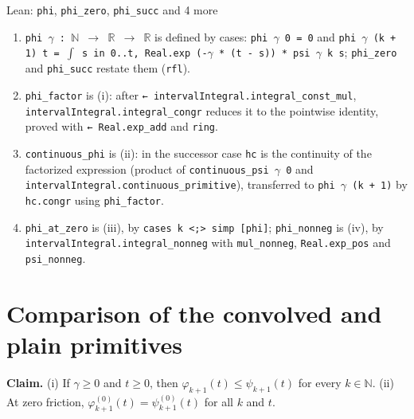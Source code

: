\documentclass[11pt,a4paper]{article}
\begin{document}
\begin{leanbox}{Lean: \texttt{phi}, \texttt{phi\_\allowbreak{}zero}, \texttt{phi\_\allowbreak{}succ} and 4 more}
\begin{enumerate}
\item \texttt{phi \ensuremath{\gamma} : \ensuremath{\mathbb N} \ensuremath{\to} \ensuremath{\mathbb R} \ensuremath{\to} \ensuremath{\mathbb R}} is defined by cases: \texttt{phi \ensuremath{\gamma} 0 = 0} and \texttt{phi \ensuremath{\gamma} (k + 1) t = \ensuremath{\int} s in 0.\allowbreak{}.\allowbreak{}t, Real.\allowbreak{}exp (-\allowbreak{}\ensuremath{\gamma} * (t -\allowbreak{} s)) * psi \ensuremath{\gamma} k s}; \texttt{phi\_\allowbreak{}zero} and \texttt{phi\_\allowbreak{}succ} restate them (\texttt{rfl}).

\item \texttt{phi\_\allowbreak{}factor} is (i): after \texttt{← interval\allowbreak{}Integral.\allowbreak{}integral\_\allowbreak{}const\_\allowbreak{}mul}, \texttt{interval\allowbreak{}Integral.\allowbreak{}integral\_\allowbreak{}congr} reduces it to the pointwise identity, proved with \texttt{← Real.\allowbreak{}exp\_\allowbreak{}add} and \texttt{ring}.

\item \texttt{continuous\_\allowbreak{}phi} is (ii): in the successor case \texttt{hc} is the continuity of the factorized expression (product of \texttt{continuous\_\allowbreak{}psi \ensuremath{\gamma} 0} and \texttt{interval\allowbreak{}Integral.\allowbreak{}continuous\_\allowbreak{}primitive}), transferred to \texttt{phi \ensuremath{\gamma} (k + 1)} by \texttt{hc.\allowbreak{}congr} using \texttt{phi\_\allowbreak{}factor}.

\item \texttt{phi\_\allowbreak{}at\_\allowbreak{}zero} is (iii), by \texttt{cases k <;> simp [phi]}; \texttt{phi\_\allowbreak{}nonneg} is (iv), by \texttt{interval\allowbreak{}Integral.\allowbreak{}integral\_\allowbreak{}nonneg} with \texttt{mul\_\allowbreak{}nonneg}, \texttt{Real.\allowbreak{}exp\_\allowbreak{}pos} and \texttt{psi\_\allowbreak{}nonneg}.

\end{enumerate}
\end{leanbox}

\section{\texorpdfstring{Comparison of the convolved and plain primitives}{Comparison of the convolved and plain primitives}}


\textbf{Claim.} (i) If \(\gamma\ge0\) and \(t\ge0\), then \(\varphi_{k+1}(t)\le\psi_{k+1}(t)\) for every \(k\in\mathbb N\).
(ii) At zero friction, \(\varphi_{k+1}^{(0)}(t)=\psi_{k+1}^{(0)}(t)\) for all \(k\) and \(t\).
\end{document}
